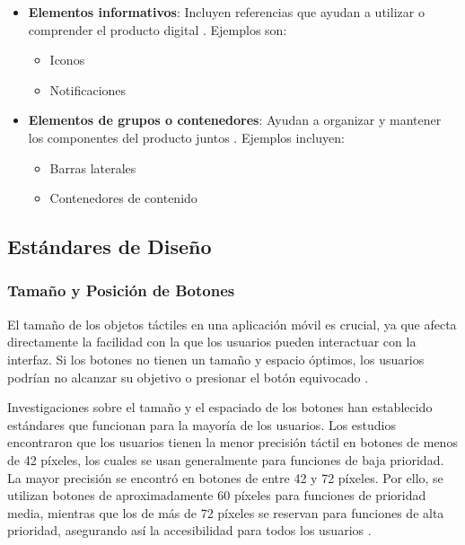 \begin{itemize}
\begin{itemize}
\begin{itemize}
        \end{itemize}
        \item \textbf{Elementos informativos}: Incluyen referencias que ayudan a utilizar o comprender el producto digital \cite{OrtegaSF}. Ejemplos son:
        \begin{itemize}
            \item Iconos
            \item Notificaciones
        \end{itemize}
        \item \textbf{Elementos de grupos o contenedores}: Ayudan a organizar y mantener los componentes del producto juntos \cite{OrtegaSF}. Ejemplos incluyen:
        \begin{itemize}
            \item Barras laterales
            \item Contenedores de contenido
        \end{itemize}
    \end{itemize}
\end{itemize}

\subsection{Estándares de Diseño}
\subsubsection{Tamaño y Posición de Botones}
El tamaño de los objetos táctiles en una aplicación móvil es crucial, ya que afecta directamente la facilidad con la que los usuarios pueden interactuar con la interfaz. Si los botones no tienen un tamaño y espacio óptimos, los usuarios podrían no alcanzar su objetivo o presionar el botón equivocado \cite{Bustos2022}.

Investigaciones sobre el tamaño y el espaciado de los botones han establecido estándares que funcionan para la mayoría de los usuarios. Los estudios encontraron que los usuarios tienen la menor precisión táctil en botones de menos de 42 píxeles, los cuales se usan generalmente para funciones de baja prioridad. La mayor precisión se encontró en botones de entre 42 y 72 píxeles. Por ello, se utilizan botones de aproximadamente 60 píxeles para funciones de prioridad media, mientras que los de más de 72 píxeles se reservan para funciones de alta prioridad, asegurando así la accesibilidad para todos los usuarios \cite{Anthony2019}.

